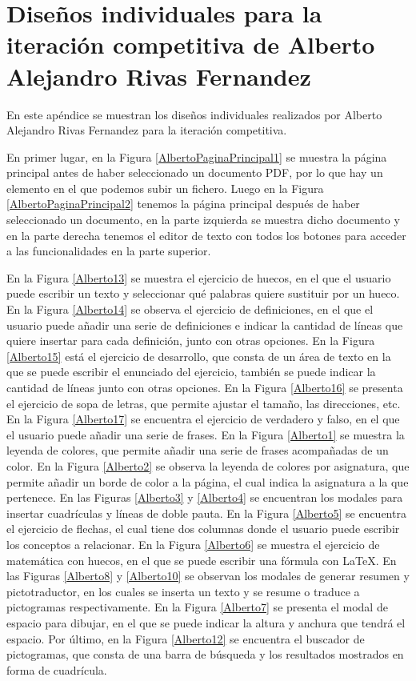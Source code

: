 \chapter{Diseños individuales para la iteración competitiva de Alberto Alejandro Rivas Fernandez}
\label{ape:disenyoAlberto}

En este apéndice se muestran los diseños individuales realizados por Alberto Alejandro Rivas Fernandez para la iteración competitiva.

En primer lugar, en la Figura \ref{AlbertoPaginaPrincipal1} se muestra la página principal antes de haber seleccionado un documento PDF, por lo que hay un elemento en el que podemos subir un fichero. Luego en la Figura \ref{AlbertoPaginaPrincipal2}  tenemos la página principal después de haber seleccionado un documento, en la parte izquierda se muestra dicho documento y en la parte derecha tenemos el editor de texto con todos los botones para acceder a las funcionalidades en la parte superior. 

En la Figura \ref{Alberto13} se muestra el ejercicio de huecos, en el que el usuario puede escribir un texto y seleccionar qué palabras quiere sustituir por un hueco. En la Figura \ref{Alberto14} se observa el ejercicio de definiciones, en el que el usuario puede añadir una serie de definiciones e indicar la cantidad de líneas que quiere insertar para cada definición, junto con otras opciones. En la Figura \ref{Alberto15} está el ejercicio de desarrollo, que consta de un área de texto en la que se puede escribir el enunciado del ejercicio, también se puede indicar la cantidad de líneas junto con otras opciones. En la Figura \ref{Alberto16} se presenta el ejercicio de sopa de letras, que permite ajustar el tamaño, las direcciones, etc. En la Figura \ref{Alberto17} se encuentra el ejercicio de verdadero y falso, en el que el usuario puede añadir una serie de frases. En la Figura \ref{Alberto1} se muestra la leyenda de colores, que permite añadir una serie de frases acompañadas de un color. En la Figura \ref{Alberto2} se observa la leyenda de colores por asignatura, que permite añadir un borde de color a la página, el cual indica la asignatura a la que pertenece. En las Figuras \ref{Alberto3} y \ref{Alberto4} se encuentran los modales para insertar cuadrículas y líneas de doble pauta. En la Figura \ref{Alberto5} se encuentra el ejercicio de flechas, el cual tiene dos columnas donde el usuario puede escribir los conceptos a relacionar. En la Figura \ref{Alberto6} se muestra el ejercicio de matemática con huecos, en el que se puede escribir una fórmula con LaTeX. En las Figuras \ref{Alberto8} y \ref{Alberto10} se observan los modales de generar resumen y pictotraductor, en los cuales se inserta un texto y se resume o traduce a pictogramas respectivamente. En la Figura \ref{Alberto7} se presenta el modal de espacio para dibujar, en el que se puede indicar la altura y anchura que tendrá el espacio. Por último, en la Figura \ref{Alberto12} se encuentra el buscador de pictogramas, que consta de una barra de búsqueda y los resultados mostrados en forma de cuadrícula.



